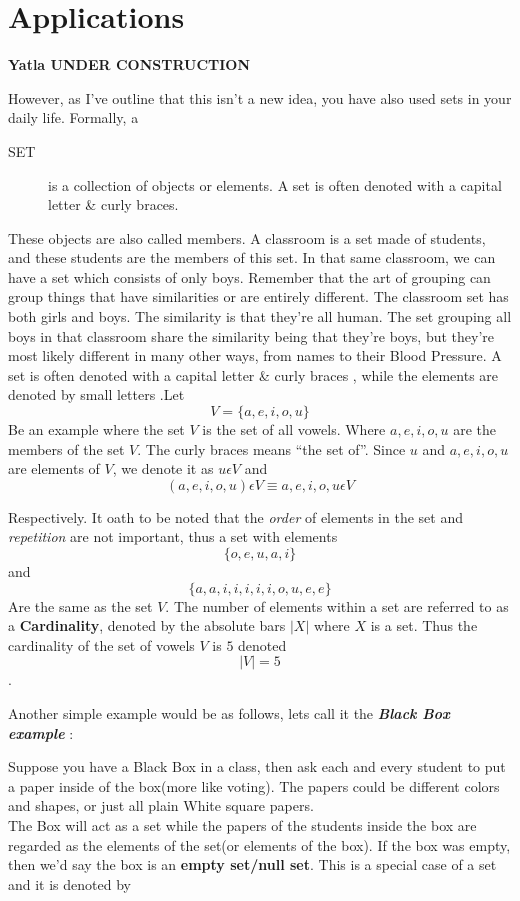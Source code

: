 \documentclass[
  letterpaper,
  DIV=11,
  numbers=noendperiod]{scrreprt}
\begin{document}
\section{Applications}\label{applications}

\textbf{Yatla \textbar{} UNDER CONSTRUCTION}

However, as I've outline that this isn't a new idea, you have also used
sets in your daily life. Formally, a

\begin{description}
\item[SET]
is a collection of objects or elements. A set is often denoted with a
capital letter \& curly braces.
\end{description}

These objects are also called members. A classroom is a set made of
students, and these students are the members of this set. In that same
classroom, we can have a set which consists of only boys. Remember that
the art of grouping can group things that have similarities or are
entirely different. The classroom set has both girls and boys. The
similarity is that they're all human. The set grouping all boys in that
classroom share the similarity being that they're boys, but they're most
likely different in many other ways, from names to their Blood Pressure.
A set is often denoted with a capital letter \& curly braces , while the
elements are denoted by small letters .Let \[
V = \{𝑎,𝑒,𝑖,𝑜,𝑢\}
\] Be an example where the set \(V\) is the set of all vowels. Where
\(𝑎,𝑒,𝑖,𝑜,𝑢\) are the members of the set \(V\). The curly braces means
``the set of''. Since \(u\) and \(a, 𝑒,𝑖, 𝑜,𝑢\) are elements of \(V\),
we denote it as \(u𝜖V\) and \[(𝑎,𝑒,𝑖,𝑜,𝑢)𝜖V ≡ 𝑎,𝑒,𝑖,𝑜,𝑢𝜖V\]

Respectively. It oath to be noted that the \emph{order} of elements in
the set and \emph{repetition} are not important, thus a set with
elements \[\{𝑜, 𝑒, 𝑢,𝑎,𝑖\}\] and \[\{𝑎,𝑎,𝑖,𝑖,𝑖,𝑖,𝑖,𝑜,𝑢,𝑒,𝑒\} \] Are the
same as the set \(V\). The number of elements within a set are referred
to as a \textbf{Cardinality}, denoted by the absolute bars \(|𝑋|\) where
\(X\) is a set. Thus the cardinality of the set of vowels \(𝑉\) is \(5\)
denoted \[|V| = 5\].

Another simple example would be as follows, lets call it the
\textbf{\emph{Black Box example}} :

Suppose you have a Black Box in a class, then ask each and every student
to put a paper inside of the box(more like voting). The papers could be
different colors and shapes, or just all plain White square papers.\\
The Box will act as a set while the papers of the students inside the
box are regarded as the elements of the set(or elements of the box). If
the box was empty, then we'd say the box is an \textbf{empty set/null
set}. This is a special case of a set and it is denoted by
\end{document}
